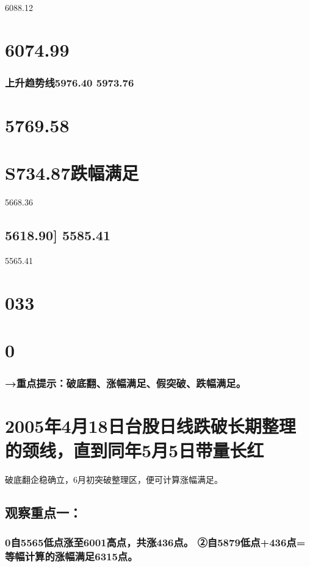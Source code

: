 \documentclass{article}
\begin{document}
6088.12

\section{6074.99}

\subsubsection{上升趋势线5976.40 5973.76}

\section{5769.58}

\section{S734.87跌幅满足}

5668.36

\subsection{5618.90] 5585.41}

5565.41

\section{033}

\section{0}

\subsubsection{→重点提示：破底翻、涨幅满足、假突破、跌幅满足。}

\section{2005年4月18日台股日线跌破长期整理的颈线，直到同年5月5日带量长红}

破底翻企稳确立，6月初突破整理区，便可计算涨幅满足。

\subsection{观察重点一：}

\subsubsection{0自5565低点涨至6001高点，共涨436点。 ②自5879低点+436点=等幅计算的涨幅满足6315点。}
\end{document}
